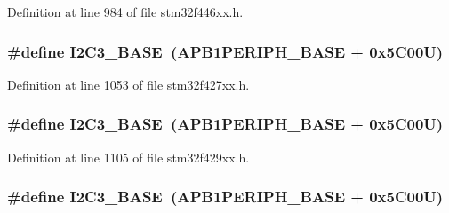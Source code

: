 Definition at line 984 of file stm32f446xx.\+h.

\subsubsection[{\texorpdfstring{I2\+C3\+\_\+\+B\+A\+SE}{I2C3_BASE}}]{\setlength{\rightskip}{0pt plus 5cm}\#define I2\+C3\+\_\+\+B\+A\+SE~({\bf A\+P\+B1\+P\+E\+R\+I\+P\+H\+\_\+\+B\+A\+SE} + 0x5\+C00\+U)}\hypertarget{group___peripheral__memory__map_ga4e8b9198748235a1729e1e8f8f24983b}{}\label{group___peripheral__memory__map_ga4e8b9198748235a1729e1e8f8f24983b}


Definition at line 1053 of file stm32f427xx.\+h.

\subsubsection[{\texorpdfstring{I2\+C3\+\_\+\+B\+A\+SE}{I2C3_BASE}}]{\setlength{\rightskip}{0pt plus 5cm}\#define I2\+C3\+\_\+\+B\+A\+SE~({\bf A\+P\+B1\+P\+E\+R\+I\+P\+H\+\_\+\+B\+A\+SE} + 0x5\+C00\+U)}\hypertarget{group___peripheral__memory__map_ga4e8b9198748235a1729e1e8f8f24983b}{}\label{group___peripheral__memory__map_ga4e8b9198748235a1729e1e8f8f24983b}


Definition at line 1105 of file stm32f429xx.\+h.

\subsubsection[{\texorpdfstring{I2\+C3\+\_\+\+B\+A\+SE}{I2C3_BASE}}]{\setlength{\rightskip}{0pt plus 5cm}\#define I2\+C3\+\_\+\+B\+A\+SE~({\bf A\+P\+B1\+P\+E\+R\+I\+P\+H\+\_\+\+B\+A\+SE} + 0x5\+C00\+U)}\hypertarget{group___peripheral__memory__map_ga4e8b9198748235a1729e1e8f8f24983b}{}\label{group___peripheral__memory__map_ga4e8b9198748235a1729e1e8f8f24983b}



